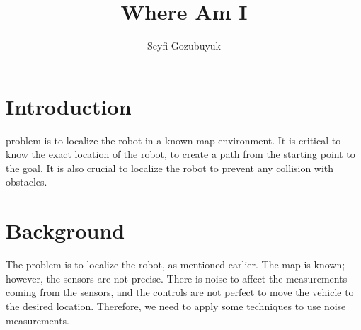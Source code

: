 \documentclass[10pt,journal,compsoc]{IEEEtran}
\begin{document}
\title{Where Am I}

\author{Seyfi Gozubuyuk}

%
{}


\maketitle
\IEEEdisplaynontitleabstractindextext
\IEEEpeerreviewmaketitle
\section{Introduction}
\label{sec:introduction}

 problem is to localize the robot in a known map environment. It is critical to know the exact location of the robot, to create a path from the starting point to the goal. It is also crucial to localize the robot to prevent any collision with obstacles.


\section{Background}
The problem is to localize the robot, as mentioned earlier. The map is known; however, the sensors are not precise. There is noise to affect the measurements coming from the sensors, and the controls are not perfect to move the vehicle to the desired location. Therefore, we need to apply some techniques to use noise measurements.\cite{lamport1994latex}
\end{document}
